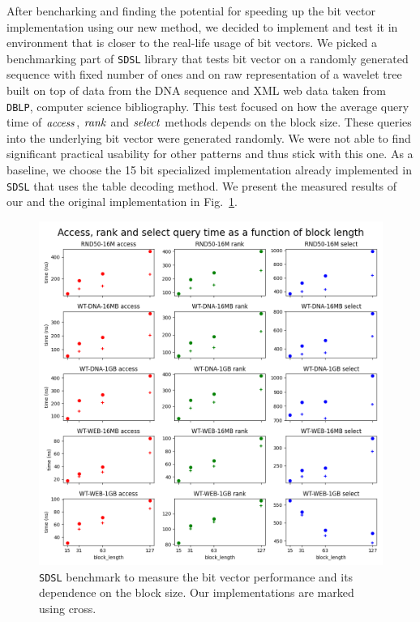 After bencharking and finding the potential for speeding up the bit vector implementation using
our new method, we decided to implement and test it in environment that is closer to the real-life
usage of bit vectors. We picked a benchmarking part of \texttt{SDSL} library that tests bit vector
on a randomly generated sequence with fixed number of ones and on raw representation of a wavelet
tree built on top of data from the DNA sequence and XML web data taken from \texttt{DBLP}, computer
science bibliography. This test focused on how the average query time of $\mathit{access}$, $\mathit{rank}$ and $\mathit{select}$
methods depends on the block size. These queries into the underlying bit vector were generated randomly.
We were not able to find significant practical usability for other patterns and thus stick with this one.
As a baseline, we choose the 15 bit specialized implementation already implemented in \texttt{SDSL}
that uses the table decoding method. We present the measured results of our and the original
implementation in Fig.~\ref{obr:benchmark_sdsl_new_method}.
\begin{figure}
	\centerline{
		\includegraphics[width=\textwidth, height=0.7\textheight]{images/benchmark_sdsl_new_method}
	}
	\caption[TODO]{\texttt{SDSL} benchmark to measure the bit vector performance and its dependence
	on the block size. Our implementations are marked using cross.
	}
	\label{obr:benchmark_sdsl_new_method}
\end{figure}

